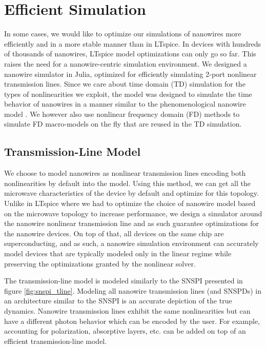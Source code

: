 \chapter{Efficient Simulation} \label{julia-sim-chapter}

In some cases, we would like to optimize our simulations of nanowires more efficiently and in a 
more stable manner than in LTspice. In devices with hundreds of thousands of nanowires, LTspice
model optimizations can only go so far. This raises the need for a nanowire-centric simulation
environment. We designed a nanowire simulator in Julia, optimized for efficiently simulating 2-port 
nonlinear transmission lines. Since we care about time domain (TD) simulation for the types of nonlinearities
we exploit, the model was designed to simulate the time behavior of nanowires in a manner
similar to the phenomenological nanowire model \cite{phen_model}. We however also use
nonlinear frequency domain (FD) methods to simulate FD macro-models on the fly that are reused in the
TD simulation.


\section{Transmission-Line Model}

We choose to model nanowires as nonlinear transmission lines encoding both nonlinearities
by default into the model. Using this method, we can get all the microwave characteristics of
the device by default and optimize for this topology. Unlike in LTspice where we had to optimize
the choice of nanowire model based on the microwave topology to increase performance, we design
a simulator around the nanowire nonlinear transmission line and as such guarantee optimizations
for the nanowire devices. On top of that, all devices on the same chip are superconducting, and
as such, a nanowire simulation environment can accurately model devices that are typically 
modeled only in the linear regime while preserving the optimizations granted by the nonlinear
solver.

The transmission-line model is modeled similarly to the SNSPI presented in figure 
\ref{fig:snspi_tline}. Modeling all nanowire transmission lines (and SNSPDs) in an architecture similar to
the SNSPI is an accurate depiction of the true dynamics. Nanowire transmission lines exhibit the same
nonlinearities but can have a different photon behavior which can be encoded by the user. For example,
accounting for polarization, absorptive layers, etc. can be added on top of an efficient transmission-line model.

